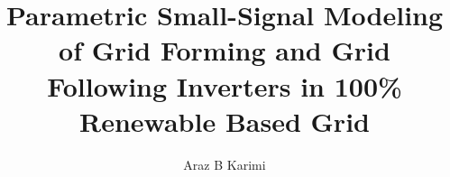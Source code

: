 \documentclass[12pt]{gatechthesis}
\title{Parametric Small-Signal Modeling of Grid Forming and Grid Following Inverters in 100\% Renewable Based Grid}
\author{Araz B Karimi}
\begin{document}


\begin{frontmatter}
    
    \makeTOC
    \makeListOfTables
    \makeListOfFigures
    
    
\end{frontmatter}

\begin{thesisbody}
     
     
     
     
     
     
    \makeBibliography
\end{thesisbody}
\end{document}

